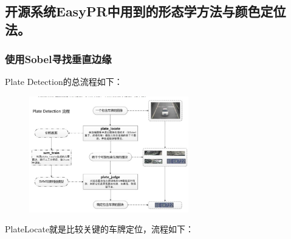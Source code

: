 \subsection{开源系统EasyPR中用到的形态学方法与颜色定位法。}
\subsubsection{使用Sobel寻找垂直边缘}
Plate Detection的总流程如下：
\begin{figure}[H]
    \centering 
    \includegraphics[width=0.618\textwidth]{image/2_6_1_1.jpg}    
    \label{logic}
\end{figure}
PlateLocate就是比较关键的车牌定位，流程如下：
